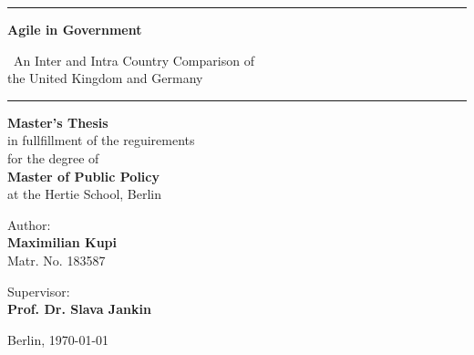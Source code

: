 \begin{titlepage}
\begin{center}
\vspace*{2cm}
	\hrule
	\vspace{1cm}
	{\huge\bfseries Agile in Government}\\ 
	\vspace{0.3cm}
	{\LARGE \ An Inter and Intra Country Comparison of \\the United Kingdom and Germany\par}
	\vspace{1cm}
	\hrule \vspace{1cm}
%
\vspace{1cm}
    {\normalsize 
   	\textbf{Master's Thesis} \\\vspace{0.5cm}
   	in fullfillment of the reguirements\\
    for the degree of \\\vspace{0.5cm}
   	{\bf Master of Public Policy}\\\vspace{0.5cm}
   	{ at the Hertie School, Berlin}}
   	
\vspace{2cm}


\begin{minipage}[t]{0.4\textwidth}
	\begin{flushleft} \large
		\normalsize{Author:\\
			\bf{Maximilian Kupi}}\\
			{Matr. No. 183587}
	\end{flushleft}
\end{minipage}
\begin{minipage}[t]{0.4\textwidth}
	\begin{flushright} \large
		\normalsize{Supervisor:\\
		\bf{Prof. Dr. Slava Jankin}}
	\end{flushright}
\end{minipage}\vspace{1cm}

\end{center}
\vspace{2cm}
\begin{center}

	Berlin, \today
\end{center}


\end{titlepage}